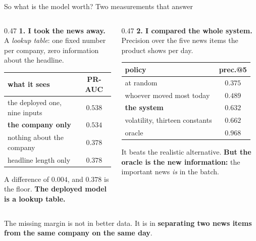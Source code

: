 \documentclass[aspectratio=169]{beamer}
\begin{document}
\begin{frame}{So what is the model worth? Two measurements that answer}
\small
\begin{columns}[T]
\begin{column}{0.47\textwidth}
\textbf{1. I took the news away.}\\[1mm]
{\scriptsize A \emph{lookup table}: one fixed number per company, zero information about the
headline.}
\vspace{1mm}
\begin{center}\scriptsize
\begin{tabular}{lc}
\toprule
\textbf{what it sees} & \textbf{PR-AUC} \\
\midrule
the deployed one, nine inputs & $0.538$ \\
\textbf{the company only} & $\mathbf{0.534}$ \\
nothing about the company & $0.378$ \\
headline length only & $0.378$ \\
\bottomrule
\end{tabular}
\end{center}
\vspace{1mm}
{\scriptsize A difference of $0.004$, and $0.378$ is the floor. \textbf{The deployed model is a
lookup table.}}
\end{column}
\begin{column}{0.47\textwidth}
\textbf{2. I compared the whole system.}\\[1mm]
{\scriptsize Precision over the five news items the product shows per day.}
\vspace{1mm}
\begin{center}\scriptsize
\begin{tabular}{lc}
\toprule
\textbf{policy} & \textbf{prec.@5} \\
\midrule
at random & $0.375$ \\
whoever moved most today & $0.489$ \\
\textbf{the system} & $\mathbf{0.632}$ \\
volatility, thirteen constants & $0.662$ \\
oracle & $0.968$ \\
\bottomrule
\end{tabular}
\end{center}
\vspace{1mm}
{\scriptsize It beats the realistic alternative. \textbf{But the oracle is the new information:}
the important news \emph{is} in the batch.}
\end{column}
\end{columns}
\vspace{2mm}
\begin{center}
The missing margin is not in better data. It is in \textbf{separating two news items from the
same company on the same day}.
\end{center}
\end{frame}
\end{document}
